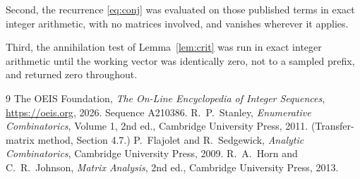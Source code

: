 \documentclass[11pt,a4paper]{article}
\theoremstyle{plain}
\theoremstyle{definition}
\begin{document}
Second, the recurrence \eqref{eq:conj} was evaluated on those published terms in exact
integer arithmetic, with no matrices involved, and vanishes wherever it applies.

Third, the annihilation test of Lemma~\ref{lem:crit} was run in exact integer arithmetic
until the working vector was identically zero, not to a sampled prefix, and returned zero
throughout.

\begin{thebibliography}{9}
 The OEIS Foundation, \emph{The On-Line Encyclopedia of Integer
Sequences}, \url{https://oeis.org}, 2026. Sequence A210386.
 R.~P.~Stanley, \emph{Enumerative Combinatorics}, Volume 1, 2nd ed.,
Cambridge University Press, 2011. (Transfer-matrix method, Section 4.7.)
 P.~Flajolet and R.~Sedgewick, \emph{Analytic Combinatorics}, Cambridge
University Press, 2009.
 R.~A.~Horn and C.~R.~Johnson, \emph{Matrix Analysis}, 2nd ed., Cambridge
University Press, 2013.
\end{thebibliography}
\end{document}
